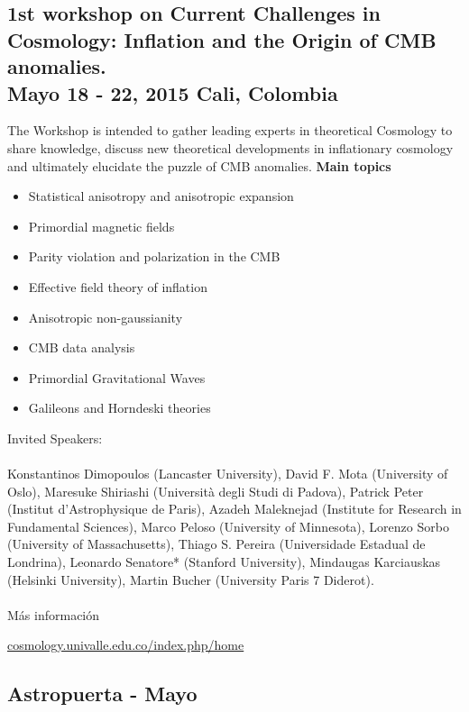 \documentclass{book}
\begin{document}
\subsection{1st workshop on Current Challenges in Cosmology: Inflation and the Origin of CMB anomalies.\\ Mayo 18 - 22, 2015 Cali, Colombia}
The Workshop is intended to gather leading experts in theoretical Cosmology to share knowledge, discuss new theoretical developments in inflationary cosmology and ultimately elucidate the puzzle of CMB anomalies. 
\textbf{Main topics}
\begin{itemize}
\item Statistical anisotropy and anisotropic expansion
\item Primordial magnetic fields
\item Parity violation and polarization in the CMB
\item Effective field theory of inflation
\item Anisotropic non-gaussianity
\item CMB data analysis
\item Primordial Gravitational  Waves
\item Galileons and Horndeski theories
\end{itemize}
\par
\noindent Invited Speakers:\\
\\
Konstantinos Dimopoulos (Lancaster University),	David F. Mota (University of Oslo), Maresuke Shiriashi (Università degli Studi di Padova), Patrick Peter
(Institut d’Astrophysique de Paris), Azadeh Maleknejad (Institute for Research in Fundamental Sciences), Marco Peloso (University of Minnesota), Lorenzo Sorbo (University of Massachusetts), Thiago S. Pereira (Universidade Estadual de Londrina), Leonardo Senatore* (Stanford University), Mindaugas Karciauskas (Helsinki University), Martin Bucher (University Paris 7 Diderot).\\
\\
Más información

\begin{center}
\url{cosmology.univalle.edu.co/index.php/home}
\end{center}




\newpage

\subsection{Astropuerta - Mayo}
\end{document}
